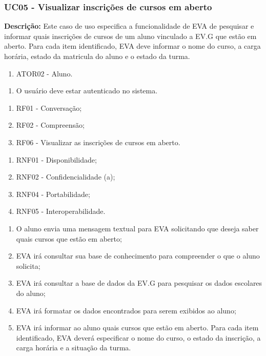 \subsubsection{UC05 - Visualizar inscrições de cursos em aberto}
\textbf{Descrição:} Este caso de uso especifica a funcionalidade de EVA de pesquisar e informar quais inscrições de cursos de um aluno vinculado a EV.G que estão em aberto. Para cada item identificado, EVA deve informar o nome do curso, a carga horária, estado da matricula do aluno e o estado da turma. 

    \begin{enumerate}[label=\alph*)]
        \tightlist
        \item ATOR02 - Aluno.
    \end{enumerate}
        

    \begin{enumerate}[label=\alph*)]
        \tightlist
        \item O usuário deve estar autenticado no sistema.
    \end{enumerate}
        
    \begin{enumerate}[label=\alph*)]
        \tightlist
        \item RF01 - Conversação;
        \item RF02 - Compreensão;
        \item RF06 - Visualizar as inscrições de cursos em aberto.
    \end{enumerate}
        
    \begin{enumerate}[label=\alph*)]
        \tightlist
        \item RNF01 - Disponibilidade;
        \item RNF02 - Confidencialidade (a);
        \item RNF04 - Portabilidade;
        \item RNF05 - Interoperabilidade.
    \end{enumerate}
        
    \begin{enumerate}[label=\alph*)]
        \tightlist
        \item O aluno envia uma mensagem textual para EVA solicitando que deseja saber quais cursos que estão em aberto;
        \item EVA irá consultar sua base de conhecimento para compreender o que o aluno solicita;
        \item EVA irá consultar a base de dados da EV.G para pesquisar os dados escolares do aluno;
        \item EVA irá formatar os dados encontrados para serem exibidos ao aluno;
        \item EVA irá informar ao aluno quais cursos que estão em aberto. Para cada item identificado, EVA deverá especificar o nome do curso, o estado da inscrição, a carga horária e a situação da turma. 
    \end{enumerate}
        
